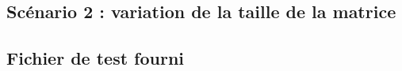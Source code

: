 \documentclass[12pt,a4paper]{article}
\begin{document}
\subsection{Scénario 2 : variation de la taille de la matrice}

\subsection{Fichier de test fourni}

%
\end{document}
